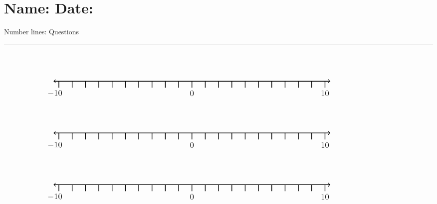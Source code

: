 \documentclass[leqno, 12pt]{article}
\def \HeadingQuestions {\section*{\Large Name: \underline{\hspace{8cm}} \hfill Date: \underline{\hspace{3cm}}} \vspace{-3mm}
{Number lines: Questions} \vspace{1pt}\hrule}
\begin{document}
  \HeadingQuestions
  \vspace{-1mm}
  \begin{equation}
    \begin{tikzpicture}[scale=0.67, baseline={([yshift=-1pt]current bounding box.north)}]
        \draw[{To[scale=1.3]}-{To[scale=1.3]}, line width=1pt] (-10.4, 0) -- (10.4, 0);
        \foreach \x in {-10,-9,...,10}
            \draw[shift={(\x,0)},color=black, line width=1pt] (0pt,-14pt) -- (0pt,0pt);
        \foreach \x in {-10}
            \draw[shift={(\x -0.3,-0.8)},color=black] node[font=\large,text height=12pt] {$\x$};
        \foreach \x in {0,10}
            \draw[shift={(\x,-0.8)},color=black] node[font=\large,text height=12pt] {$\x$};
        \node [font=\large, anchor=east] at (15,1.65){$  $};
    \end{tikzpicture}
\end{equation}
\vspace{10pt}\begin{equation}
    \begin{tikzpicture}[scale=0.67, baseline={([yshift=-1pt]current bounding box.north)}]
        \draw[{To[scale=1.3]}-{To[scale=1.3]}, line width=1pt] (-10.4, 0) -- (10.4, 0);
        \foreach \x in {-10,-9,...,10}
            \draw[shift={(\x,0)},color=black, line width=1pt] (0pt,-14pt) -- (0pt,0pt);
        \foreach \x in {-10}
            \draw[shift={(\x -0.3,-0.8)},color=black] node[font=\large,text height=12pt] {$\x$};
        \foreach \x in {0,10}
            \draw[shift={(\x,-0.8)},color=black] node[font=\large,text height=12pt] {$\x$};
        \node [font=\large, anchor=east] at (15,1.65){$  $};
    \end{tikzpicture}
\end{equation}
\vspace{10pt}\begin{equation}
    \begin{tikzpicture}[scale=0.67, baseline={([yshift=-1pt]current bounding box.north)}]
        \draw[{To[scale=1.3]}-{To[scale=1.3]}, line width=1pt] (-10.4, 0) -- (10.4, 0);
        \foreach \x in {-10,-9,...,10}
            \draw[shift={(\x,0)},color=black, line width=1pt] (0pt,-14pt) -- (0pt,0pt);
        \foreach \x in {-10}
            \draw[shift={(\x -0.3,-0.8)},color=black] node[font=\large,text height=12pt] {$\x$};
        \foreach \x in {0,10}
            \draw[shift={(\x,-0.8)},color=black] node[font=\large,text height=12pt] {$\x$};
        \node [font=\large, anchor=east] at (15,1.65){$  $};
    \end{tikzpicture}
\end{equation}
\end{document}
